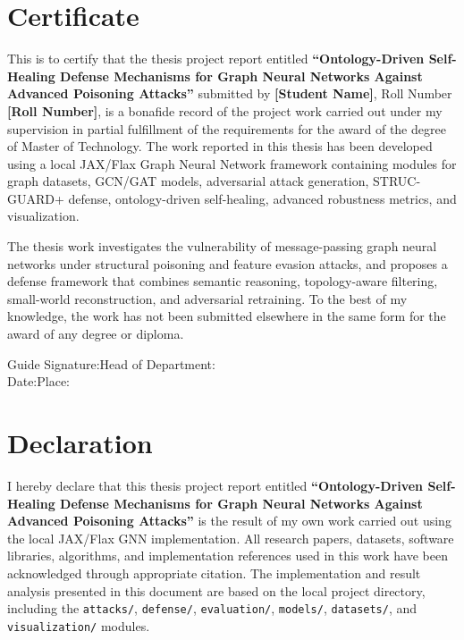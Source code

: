 \documentclass[12pt,oneside]{report}
\begin{document}
\chapter*{Certificate}
This is to certify that the thesis project report entitled \textbf{``Ontology-Driven Self-Healing Defense Mechanisms for Graph Neural Networks Against Advanced Poisoning Attacks''} submitted by \textbf{[Student Name]}, Roll Number \textbf{[Roll Number]}, is a bonafide record of the project work carried out under my supervision in partial fulfillment of the requirements for the award of the degree of Master of Technology. The work reported in this thesis has been developed using a local JAX/Flax Graph Neural Network framework containing modules for graph datasets, GCN/GAT models, adversarial attack generation, STRUC-GUARD+ defense, ontology-driven self-healing, advanced robustness metrics, and visualization.

The thesis work investigates the vulnerability of message-passing graph neural networks under structural poisoning and feature evasion attacks, and proposes a defense framework that combines semantic reasoning, topology-aware filtering, small-world reconstruction, and adversarial retraining. To the best of my knowledge, the work has not been submitted elsewhere in the same form for the award of any degree or diploma.

\vspace{0.8in}
\noindent Guide Signature:\hfill Head of Department:\hspace{0.6in}\\[0.4in]
\noindent Date:\hfill Place:\hspace{1.3in}

\chapter*{Declaration}
I hereby declare that this thesis project report entitled \textbf{``Ontology-Driven Self-Healing Defense Mechanisms for Graph Neural Networks Against Advanced Poisoning Attacks''} is the result of my own work carried out using the local JAX/Flax GNN implementation. All research papers, datasets, software libraries, algorithms, and implementation references used in this work have been acknowledged through appropriate citation. The implementation and result analysis presented in this document are based on the local project directory, including the \texttt{attacks/}, \texttt{defense/}, \texttt{evaluation/}, \texttt{models/}, \texttt{datasets/}, and \texttt{visualization/} modules.
\end{document}
